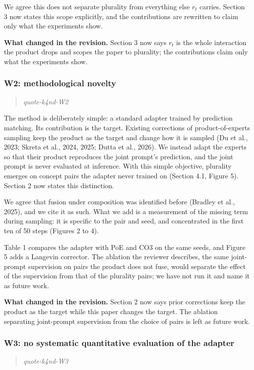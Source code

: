 \documentclass[11pt]{article}
\def\showquotes{}        %
\newcommand{\reviewquote}[2]{\ifdefined\showquotes\begin{quote}\color{rev}\itshape\csname quote-#1-#2\endcsname\end{quote}\fi}
\newcommand{\changed}[1]{\par{\color{chg}\textbf{What changed in the revision.}} #1\par}
\begin{document}
We agree this does not separate plurality from everything else $r_t$ carries. Section 3 now states this scope explicitly, and the contributions are rewritten to claim only what the experiments show.

\changed{Section 3 now says $r_t$ is the whole interaction the product drops and scopes the paper to plurality; the contributions claim only what the experiments show.}

\subsubsection*{W2: methodological novelty}
\reviewquote{k4nd}{W2}

The method is deliberately simple: a standard adapter trained by prediction matching. Its contribution is the target. Existing corrections of product-of-experts sampling keep the product as the target and change how it is sampled (Du et al., 2023; Skreta et al., 2024, 2025; Dutta et al., 2026). We instead adapt the experts so that their product reproduces the joint prompt's prediction, and the joint prompt is never evaluated at inference. With this simple objective, plurality emerges on concept pairs the adapter never trained on (Section 4.1, Figure 5). Section 2 now states this distinction.

We agree that fusion under composition was identified before (Bradley et al., 2025), and we cite it as such. What we add is a measurement of the missing term during sampling: it is specific to the pair and seed, and concentrated in the first ten of 50 steps (Figures 2 to 4).

Table 1 compares the adapter with PoE and CO3 on the same seeds, and Figure 5 adds a Langevin corrector. The ablation the reviewer describes, the same joint-prompt supervision on pairs the product does not fuse, would separate the effect of the supervision from that of the plurality pairs; we have not run it and name it as future work.

\changed{Section 2 now says prior corrections keep the product as the target while this paper changes the target. The ablation separating joint-prompt supervision from the choice of pairs is left as future work.}

\subsubsection*{W3: no systematic quantitative evaluation of the adapter}
\reviewquote{k4nd}{W3}
\end{document}

